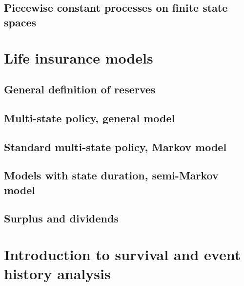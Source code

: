 \documentclass[a4paper,10pt,openany]{book}
\begin{document}
\hypertarget{piecewise-constant-processes-on-finite-state-spaces}{%
\subsection{Piecewise constant processes on finite state spaces}\label{piecewise-constant-processes-on-finite-state-spaces}}

\hypertarget{life-insurance-models}{%
\section{Life insurance models}\label{life-insurance-models}}

\hypertarget{general-definition-of-reserves}{%
\subsection{General definition of reserves}\label{general-definition-of-reserves}}

\hypertarget{multi-state-policy-general-model}{%
\subsection{Multi-state policy, general model}\label{multi-state-policy-general-model}}

\hypertarget{standard-multi-state-policy-markov-model}{%
\subsection{Standard multi-state policy, Markov model}\label{standard-multi-state-policy-markov-model}}

\hypertarget{models-with-state-duration-semi-markov-model}{%
\subsection{Models with state duration, semi-Markov model}\label{models-with-state-duration-semi-markov-model}}

\hypertarget{surplus-and-dividends}{%
\subsection{Surplus and dividends}\label{surplus-and-dividends}}

\hypertarget{introduction-to-survival-and-event-history-analysis}{%
\section{Introduction to survival and event history analysis}\label{introduction-to-survival-and-event-history-analysis}}
\end{document}
